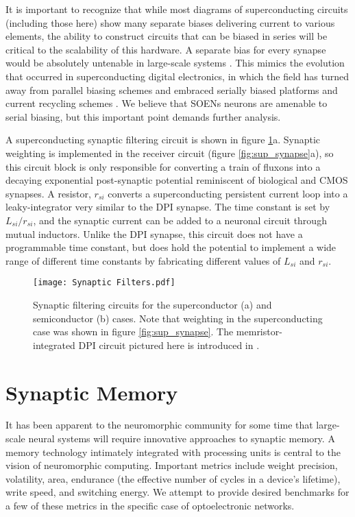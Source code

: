 \documentclass[twocolumn]{article}
\begin{document}
It is important to recognize that while most diagrams of superconducting circuits (including those here) show many separate biases delivering current to various elements, the ability to construct circuits that can be biased in series will be critical to the scalability of this hardware. A separate bias for every synapse would be absolutely untenable in large-scale systems \cite{sergey}. This mimics the evolution that occurred in superconducting digital electronics, in which the field has turned away from parallel biasing schemes and embraced serially biased platforms \cite{tolpygo2016superconductor} and current recycling schemes \cite{kisa2011}. We believe that SOENs neurons are amenable to serial biasing, but this important point demands further analysis.

A superconducting synaptic filtering circuit is shown in figure \ref{fig:filtering}a. Synaptic weighting is implemented in the receiver circuit (figure \ref{fig:sup_synapse}a), so this circuit block is only responsible for converting a train of fluxons into a decaying exponential post-synaptic potential reminiscent of biological and CMOS synapses. A resistor, $r_{si}$ converts a superconducting persistent current loop into a leaky-integrator very similar to the DPI synapse. The time constant is set by $L_{si}/r_{si}$, and the synaptic current can be added to a neuronal circuit through mutual inductors. Unlike the DPI synapse, this circuit does not have a programmable time constant, but does hold the potential to implement a wide range of different time constants by fabricating different values of $L_{si}$ and $r_{si}$. 
\begin{figure}[h!]
    \centering
    \texttt{[image: Synaptic Filters.pdf]}
    \caption{Synaptic filtering circuits for the superconductor (a) and semiconductor (b) cases.  Note that weighting in the superconducting case was shown in figure \ref{fig:sup_synapse}. The memristor-integrated DPI circuit pictured here is introduced in \cite{dalgaty2019hybrid}. }
    \label{fig:filtering}
\end{figure}

\section{\label{sec:memory}Synaptic Memory}
It has been apparent to the neuromorphic community for some time that large-scale neural systems will require innovative approaches to synaptic memory. A memory technology intimately integrated with processing units is central to the vision of neuromorphic computing. Important metrics include weight precision, volatility, area, endurance (the effective number of cycles in a device's lifetime), write speed, and switching energy. We attempt to provide desired benchmarks for a few of these metrics in the specific case of optoelectronic networks.
\end{document}

